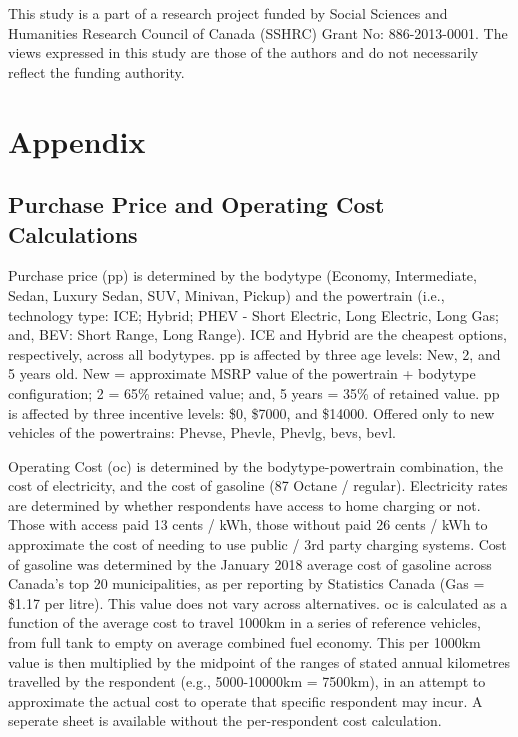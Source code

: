 \documentclass[]{elsarticle} %
\begin{document}
This study is a part of a research project funded by Social Sciences and
Humanities Research Council of Canada (SSHRC) Grant No: 886-2013-0001.
The views expressed in this study are those of the authors and do not
necessarily reflect the funding authority.

\section{Appendix}\label{appendix}

\subsection{Purchase Price and Operating Cost
Calculations}\label{purchase-price-and-operating-cost-calculations}

Purchase price (pp) is determined by the bodytype (Economy,
Intermediate, Sedan, Luxury Sedan, SUV, Minivan, Pickup) and the
powertrain (i.e., technology type: ICE; Hybrid; PHEV - Short Electric,
Long Electric, Long Gas; and, BEV: Short Range, Long Range). ICE and
Hybrid are the cheapest options, respectively, across all bodytypes. pp
is affected by three age levels: New, 2, and 5 years old. New =
approximate MSRP value of the powertrain + bodytype configuration; 2 =
65\% retained value; and, 5 years = 35\% of retained value. pp is
affected by three incentive levels: \$0, \$7000, and \$14000. Offered
only to new vehicles of the powertrains: Phevse, Phevle, Phevlg, bevs,
bevl.

Operating Cost (oc) is determined by the bodytype-powertrain
combination, the cost of electricity, and the cost of gasoline (87
Octane / regular). Electricity rates are determined by whether
respondents have access to home charging or not. Those with access paid
13 cents / kWh, those without paid 26 cents / kWh to approximate the
cost of needing to use public / 3rd party charging systems. Cost of
gasoline was determined by the January 2018 average cost of gasoline
across Canada's top 20 municipalities, as per reporting by Statistics
Canada (Gas = \$1.17 per litre). This value does not vary across
alternatives. oc is calculated as a function of the average cost to
travel 1000km in a series of reference vehicles, from full tank to empty
on average combined fuel economy. This per 1000km value is then
multiplied by the midpoint of the ranges of stated annual kilometres
travelled by the respondent (e.g., 5000-10000km = 7500km), in an attempt
to approximate the actual cost to operate that specific respondent may
incur. A seperate sheet is available without the per-respondent cost
calculation.
\end{document}
